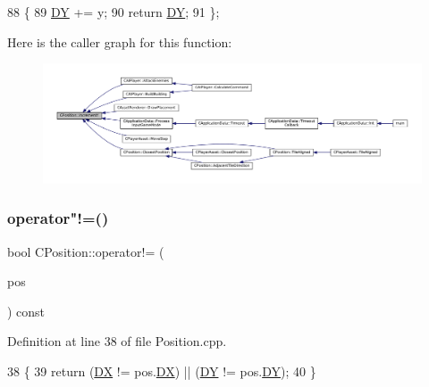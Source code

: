\begin{DoxyCode}
88                              \{
89             \hyperlink{classCPosition_a84139c9e8eb547e7cf3cb851739943a4}{DY} += y;
90             \textcolor{keywordflow}{return} \hyperlink{classCPosition_a84139c9e8eb547e7cf3cb851739943a4}{DY};
91         \};
\end{DoxyCode}
Here is the caller graph for this function\+:
\nopagebreak
\begin{figure}[H]
\begin{center}
\leavevmode
\includegraphics[width=350pt]{classCPosition_a3f2a26798bb27b1252ff1be303b3adfc_icgraph}
\end{center}
\end{figure}
\hypertarget{classCPosition_ad7a23f4b734883e26de15c2487218b07}{}\label{classCPosition_ad7a23f4b734883e26de15c2487218b07} 
\subsubsection{\texorpdfstring{operator"!=()}{operator!=()}}
{\footnotesize\ttfamily bool C\+Position\+::operator!= (\begin{DoxyParamCaption}\item[{const \hyperlink{classCPosition}{C\+Position} \&}]{pos }\end{DoxyParamCaption}) const}



Definition at line 38 of file Position.\+cpp.


\begin{DoxyCode}
38                                                     \{
39     \textcolor{keywordflow}{return} (\hyperlink{classCPosition_a28445f9b872169715919074d82044eda}{DX} != pos.\hyperlink{classCPosition_a28445f9b872169715919074d82044eda}{DX}) || (\hyperlink{classCPosition_a84139c9e8eb547e7cf3cb851739943a4}{DY} != pos.\hyperlink{classCPosition_a84139c9e8eb547e7cf3cb851739943a4}{DY});
40 \}
\end{DoxyCode}
\hypertarget{classCPosition_ae131ec912eb7272d2bdfbdcbb7848acb}{}\label{classCPosition_ae131ec912eb7272d2bdfbdcbb7848acb} 
